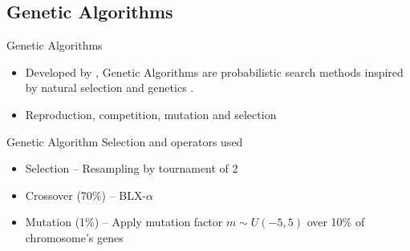\documentclass[12pt,portuguese]{beamer}
\begin{document}
\subsection{Genetic Algorithms}
\begin{frame}{Genetic Algorithms}
\begin{itemize}
	\item Developed by \citet{Holland1975}, Genetic Algorithms are probabilistic search methods inspired by natural selection and genetics \citep{Gaspar2012}.
	\item Reproduction, competition, mutation and selection
\end{itemize}
\begin{center}
\end{center}
\end{frame}

\begin{frame}{Genetic Algorithm}
	Selection and operators used
	\begin{itemize}
		\item Selection -- Resampling by tournament of 2
		\item Crossover (70\%) -- BLX-$\alpha$
		\item Mutation (1\%) -- Apply mutation factor $m \sim U(-5,5)$ over 10\% of chromosome's genes
	\end{itemize}
\end{frame}

\end{document}
